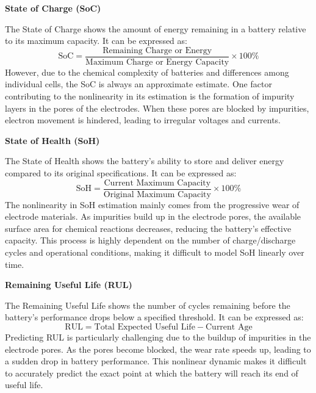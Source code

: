 \vspace{1cm}
\textbf{State of Charge (SoC)}

The State of Charge shows the amount of energy remaining in a battery relative to its maximum capacity. It can be expressed as:
\begin{equation}
\text{SoC} = \frac{\text{Remaining Charge or Energy}}{\text{Maximum Charge or Energy Capacity}} \times 100\%
\end{equation}
However, due to the chemical complexity of batteries and differences among individual cells, the SoC is always an approximate estimate. One factor contributing to the nonlinearity in its estimation is the formation of impurity layers in the pores of the electrodes. When these pores are blocked by impurities, electron movement is hindered, leading to irregular voltages and currents.

\vspace{1cm}
\textbf{State of Health (SoH)}

The State of Health shows the battery's ability to store and deliver energy compared to its original specifications. It can be expressed as:
\begin{equation}
\text{SoH} = \frac{\text{Current Maximum Capacity}}{\text{Original Maximum Capacity}} \times 100\%
\end{equation}
The nonlinearity in SoH estimation mainly comes from the progressive wear of electrode materials. As impurities build up in the electrode pores, the available surface area for chemical reactions decreases, reducing the battery's effective capacity. This process is highly dependent on the number of charge/discharge cycles and operational conditions, making it difficult to model SoH linearly over time.

\vspace{1cm}
\textbf{Remaining Useful Life (RUL)}

The Remaining Useful Life shows the number of cycles remaining before the battery's performance drops below a specified threshold. It can be expressed as:
\begin{equation}
\text{RUL} = \text{Total Expected Useful Life} - \text{Current Age}
\end{equation}
Predicting RUL is particularly challenging due to the buildup of impurities in the electrode pores. As the pores become blocked, the wear rate speeds up, leading to a sudden drop in battery performance. This nonlinear dynamic makes it difficult to accurately predict the exact point at which the battery will reach its end of useful life.
\vspace{1cm}

